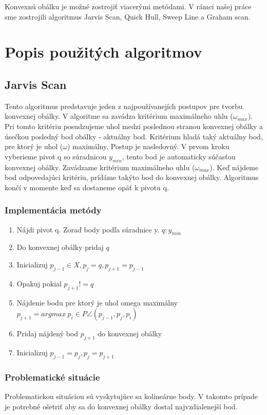 \documentclass[12pt]{article}
\begin{document}
Konvexnú obálku je možné zostrojiť viacerými metódami. V rámci našej práce sme zostrojili algoritmus Jarvis Scan, Quick Hull, Sweep Line a Graham scan.

\clearpage 
\section {Popis použitých algoritmov}
\subsection {Jarvis Scan}
Tento algoritmus predstavuje jeden z najpoužívanejích postupov pre tvorbu konvexnej obálky. V algoritme sa zavádza kritérium maximálneho uhlu ($\omega_{max}$). Pri tomto kritériu posudzujeme uhol medzi poslednou stranou konvexnej obálky a úsečkou posledný bod obálky - aktuálny bod. Kritérium hladá taký aktuálny bod, pre ktorý je uhol ($\omega$) maximálny. 
Postup je nasledovný. V prvom kroku vyberieme pivot q so súradnicou $y_{min}$, tento bod je automaticky súčasťou konvexnej obálky. Zavádzame kritérium maximálneho uhlu ($\omega_{max}$). Keď nájdeme bod odpovedajúci kritériu, prídáme takýto bod do konvexnej obálky. Algoritmus končí v momente keď sa dostaneme opäť k pivotu q. 

\subsubsection {Implementácia metódy}
\begin{enumerate}
\item Nájdi pivot q. Zoraď body podľa súradnice y. $ q : y_{min}$
\item Do konvexnej obálky pridaj $q$
\item Inicializuj  $p_{j-1} \in X, p_j = q, p_{j+1} = p_{j-1}$
\item Opakuj pokial $p_{j+1} != q$
\item \hspace {1.5cm} Nájdenie bodu pre ktorý je uhol omega maximálny $p_{j+1} = argmax \ p_i \in P \angle(p_{j-1}, p_j, p_i)$
\item \hspace {1.5cm} Pridaj nájdený bod  $p_{j+1}$ do konvexnej obálky
\item \hspace {1.5cm} Inicializuj $p_{j-1} = p_j , p_j = p_{j+1}$ 
\end{enumerate}

\subsubsection {Problematické situácie}
Problematickou situáciou sú vyskytujúce sa kolineárne body. V takomto prípade je potrebné ošetriť aby sa do konvexnej obálky dostal najvzdialenejší bod.
\end{document}
